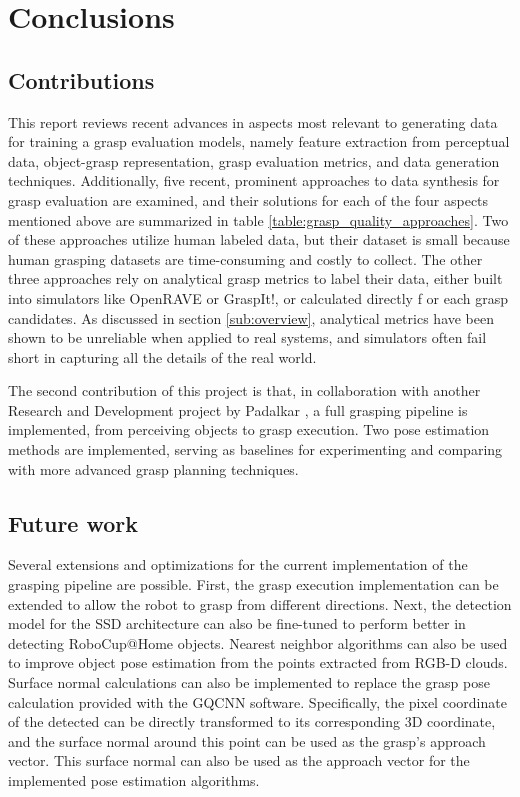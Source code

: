 
\chapter{Conclusions}


\section{Contributions}

This report reviews recent advances in aspects most relevant to generating data for training a grasp evaluation models,
namely feature extraction from perceptual data, object-grasp representation, grasp evaluation metrics, and data
generation techniques. Additionally, five recent, prominent approaches to data synthesis for grasp evaluation are
examined, and their solutions for each of the four aspects mentioned above are summarized in table
\ref{table:grasp_quality_approaches}. Two of these approaches utilize human labeled data, but their dataset is small
because human grasping datasets are time-consuming and costly to collect. The other three approaches rely on analytical
grasp metrics to label their data, either built into simulators like OpenRAVE or GraspIt!, or calculated directly f
or each grasp candidates. As discussed in section \ref{sub:overview}, analytical metrics have been shown to be
unreliable when applied to real systems, and simulators often fail short in capturing all the details of the real world.

The second contribution of this project is that, in collaboration with another Research and Development project by
Padalkar \cite{Padalkar2018}, a full grasping pipeline is implemented, from perceiving objects to grasp execution. Two
pose estimation methods are implemented, serving as baselines for experimenting and comparing with more advanced grasp
planning techniques.


\section{Future work}

Several extensions and optimizations for the current implementation of the grasping pipeline are possible. First, the
grasp execution implementation can be extended to allow the robot to grasp from different directions. Next, the
detection model for the SSD architecture can also be fine-tuned to perform better in detecting RoboCup@Home objects.
Nearest neighbor algorithms can also be used to improve object pose estimation from the points extracted from RGB-D
clouds. Surface normal calculations can also be implemented to replace the grasp pose calculation provided with the
GQCNN software. Specifically, the pixel coordinate of the detected can be directly transformed to its corresponding 3D
coordinate, and the surface normal around this point can be used as the grasp's approach vector. This surface normal
can also be used as the approach vector for the implemented pose estimation algorithms.

